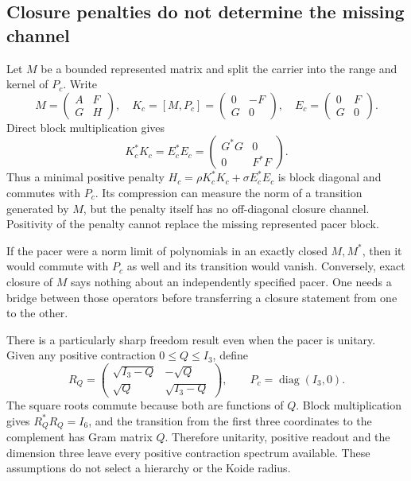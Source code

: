 \documentclass[11pt,a4paper]{article}
\begin{document}
\subsection{Closure penalties do not determine the missing channel}
Let $M$ be a bounded represented matrix and split the carrier into
the range and kernel of $P_c$. Write
\begin{equation}
 M=\begin{pmatrix}A&F\\G&H\end{pmatrix},\quad
 K_c=[M,P_c]=\begin{pmatrix}0&-F\\G&0\end{pmatrix},\quad
 E_c=\begin{pmatrix}0&F\\G&0\end{pmatrix}.
\end{equation}
Direct block multiplication gives
\begin{equation}
 K_c^*K_c=E_c^*E_c=
 \begin{pmatrix}G^*G&0\\0&F^*F\end{pmatrix}.
\end{equation}
Thus a minimal positive penalty
$H_c=\rho K_c^*K_c+\sigma E_c^*E_c$ is block diagonal and
commutes with $P_c$. Its compression can measure the norm of a
transition generated by $M$, but the penalty itself has no off-diagonal
closure channel. Positivity of the penalty cannot replace the missing
represented pacer block.

If the pacer were a norm limit of polynomials in an exactly closed
$M,M^*$, then it would commute with $P_c$ as well and its transition
would vanish. Conversely, exact closure of $M$ says nothing about
an independently specified pacer. One needs a bridge between those
operators before transferring a closure statement from one to the other.

There is a particularly sharp freedom result even when the pacer is
unitary. Given any positive contraction $0\leq Q\leq I_3$, define
\begin{equation}
 R_Q=\begin{pmatrix}\sqrt{I_3-Q}&-\sqrt Q\\
                         \sqrt Q&\sqrt{I_3-Q}\end{pmatrix},\qquad
 P_c=\operatorname{diag}(I_3,0).
\end{equation}
The square roots commute because both are functions of $Q$.
Block multiplication gives $R_Q^*R_Q=I_6$, and the transition from
the first three coordinates to the complement has Gram matrix $Q$.
Therefore unitarity, positive readout and the dimension three leave
every positive contraction spectrum available. These assumptions
do not select a hierarchy or the Koide radius.
\end{document}
